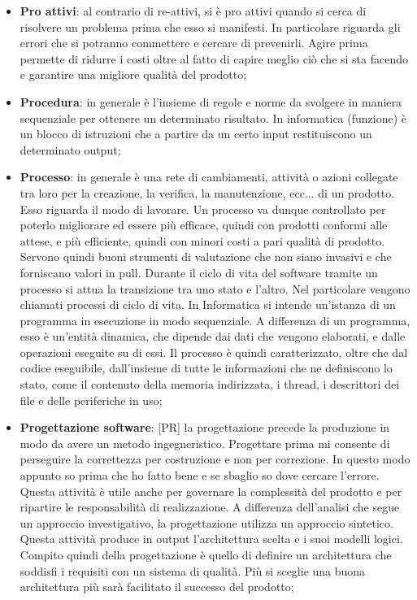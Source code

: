 \begin{itemize}
	\item \textbf{Pro attivi}: al contrario di re-attivi, si è pro attivi quando si cerca di risolvere un problema prima che esso si manifesti. In particolare riguarda gli errori che si potranno commettere e cercare di prevenirli. \newline
Agire prima permette di ridurre i costi oltre al fatto di capire meglio ciò che si sta facendo e garantire una migliore qualità del prodotto;

	\item \textbf{Procedura}: in generale è l'insieme di regole e norme da svolgere in maniera sequenziale per ottenere un determinato risultato. \newline
In informatica (funzione) è un blocco di istruzioni che a partire da un certo input restituiscono un determinato output;

	\item \textbf{Processo}:  in generale è una rete di cambiamenti, attività o azioni collegate tra loro per la creazione, la verifica, la manutenzione, ecc... di un prodotto. Esso riguarda il modo di lavorare. Un processo va dunque controllato per poterlo migliorare ed essere più efficace, quindi con prodotti conformi alle attese, e più efficiente, quindi con minori costi a pari qualità di prodotto. \newline
	Servono quindi buoni strumenti di valutazione che non siano invasivi e che forniscano valori in pull. \newline
	Durante il ciclo di vita del software tramite un processo si attua la transizione tra uno stato e l'altro. Nel particolare vengono chiamati processi di ciclo di vita. \newline
	In Informatica si intende un'istanza di un programma in esecuzione in modo sequenziale. A differenza di un programma, esso è un'entità dinamica, che dipende dai dati che vengono elaborati, e dalle operazioni eseguite su di essi. Il processo è quindi caratterizzato, oltre che dal codice eseguibile, dall'insieme di tutte le informazioni che ne definiscono lo stato, come il contenuto della memoria indirizzata, i thread, i descrittori dei file e delle periferiche in uso;

	\item \textbf{Progettazione software}: [PR] la progettazione precede la produzione in modo da avere un metodo ingegneristico. Progettare prima mi consente di perseguire la correttezza per costruzione e non per correzione. In questo modo appunto so prima che ho fatto bene e se sbaglio so dove cercare l'errore. Questa attività è utile anche per governare la complessità del prodotto e per ripartire le responsabilità di realizzazione. \newline
	A differenza dell'analisi che segue un approccio investigativo, la progettazione utilizza un approccio sintetico. Questa attività produce in output l'architettura scelta e i suoi modelli logici. \newline
	Compito quindi della progettazione è quello di definire un architettura che soddisfi i requisiti con un sistema di qualità. Più si sceglie una buona architettura più sarà facilitato il successo del prodotto;


\end{itemize}
